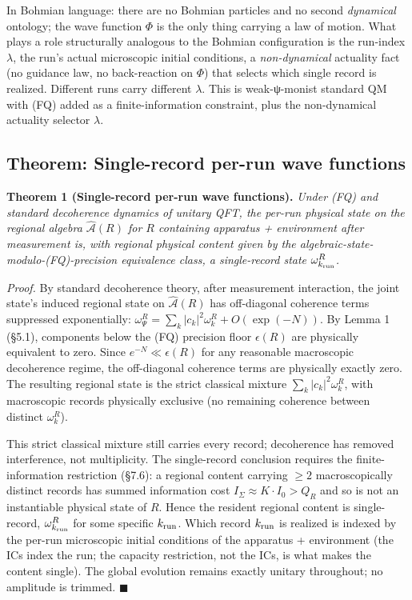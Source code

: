 \documentclass[11pt,a4paper]{article}
\begin{document}
In Bohmian language: there are no Bohmian particles and no second \emph{dynamical} ontology; the wave function $\Phi$ is the only thing carrying a law of motion. What plays a role structurally analogous to the Bohmian configuration is the run-index $\lambda$, the run's actual microscopic initial conditions, a \emph{non-dynamical} actuality fact (no guidance law, no back-reaction on $\Phi$) that selects which single record is realized. Different runs carry different $\lambda$. This is weak-ψ-monist standard QM with (FQ) added as a finite-information constraint, plus the non-dynamical actuality selector $\lambda$.

\subsection{Theorem: Single-record per-run wave functions}

\textbf{Theorem 1 (Single-record per-run wave functions).} \emph{Under (FQ) and standard decoherence dynamics of unitary QFT, the per-run physical state on the regional algebra $\hat{\mathcal{A}}(R)$ for $R$ containing apparatus + environment after measurement is, with regional physical content given by the algebraic-state-modulo-(FQ)-precision equivalence class, a single-record state $\omega_{k_{\rm run}}^R$.}

\emph{Proof.} By standard decoherence theory, after measurement interaction, the joint state's induced regional state on $\hat{\mathcal{A}}(R)$ has off-diagonal coherence terms suppressed exponentially: $\omega_\Psi^R = \sum_k |c_k|^2 \omega_k^R + O(\exp(-N))$. By Lemma 1 (§5.1), components below the (FQ) precision floor $\epsilon(R)$ are physically equivalent to zero. Since $e^{-N} \ll \epsilon(R)$ for any reasonable macroscopic decoherence regime, the off-diagonal coherence terms are physically exactly zero. The resulting regional state is the strict classical mixture $\sum_k |c_k|^2 \omega_k^R$, with macroscopic records physically exclusive (no remaining coherence between distinct $\omega_k^R$).

This strict classical mixture still carries every record; decoherence has removed interference, not multiplicity. The single-record conclusion requires the finite-information restriction (§7.6): a regional content carrying $\ge 2$ macroscopically distinct records has summed information cost $I_\Sigma \approx K\cdot I_0 > Q_R$ and so is not an instantiable physical state of $R$. Hence the resident regional content is single-record, $\omega_{k_{\rm run}}^R$ for some specific $k_{\rm run}$. Which record $k_{\rm run}$ is realized is indexed by the per-run microscopic initial conditions of the apparatus + environment (the ICs index the run; the capacity restriction, not the ICs, is what makes the content single). The global evolution remains exactly unitary throughout; no amplitude is trimmed. $\blacksquare$
\end{document}
